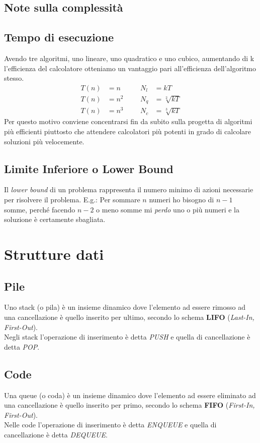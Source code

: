 \documentclass{article}
\begin{document}
\subsection{Note sulla complessità}
\subsection*{Tempo di esecuzione}
Avendo tre algoritmi, uno lineare, uno quadratico e uno cubico, aumentando di k l'efficienza del calcolatore otteniamo un vantaggio pari all'efficienza dell'algoritmo stesso.
\begin{align*} T(n) & = n &  &  & N_l & = kT \\ T(n) & = n^2 & & & N_q & =
               \sqrt[2]{kT}                  \\ T(n) & = n^3 & & & N_c & = \sqrt[3]{kT}\end{align*}
Per questo motivo conviene concentrarsi fin da subito sulla progetta di algoritmi più efficienti piuttosto che attendere calcolatori più potenti in grado di calcolare soluzioni più velocemente.
\subsection*{Limite Inferiore o Lower Bound}
Il \emph{lower bound} di un problema rappresenta il numero minimo di azioni necessarie per risolvere il problema.
E.g.: Per sommare \(n\) numeri ho bisogno di \(n-1\) somme, perché facendo \(n-2\) o meno somme mi \emph{perdo} uno o più numeri e la soluzione è certamente sbagliata.
\pagebreak

\section{Strutture dati}
\subsection{Pile}
Uno stack (o pila) è un insieme dinamico dove l'elemento ad essere rimosso ad una cancellazione è quello inserito per ultimo, secondo lo schema \textbf{LIFO} (\emph{Last-In, First-Out}). \\
Negli stack l'operazione di inserimento è detta \emph{PUSH} e quella di cancellazione è detta \emph{POP}.
\subsection{Code}
Una queue (o coda) è un insieme dinamico dove l'elemento ad essere eliminato ad una cancellazione è quello inserito per primo, secondo lo schema \textbf{FIFO} (\emph{First-In, First-Out}). \\
Nelle code l'operazione di inserimento è detta \emph{ENQUEUE} e quella di cancellazione è detta \emph{DEQUEUE}.
\end{document}
